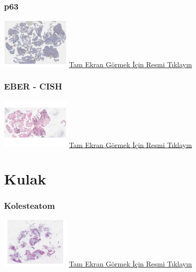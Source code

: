 \documentclass[
  letterpaper,
  DIV=11,
  numbers=noendperiod]{scrreprt}
\begin{document}
\hypertarget{p63}{%
\subsection{p63}\label{p63}}

\href{https://images.patolojiatlasi.com/nasopharynx-nonkeratinizing-scc/p63.html}{\includegraphics[width=0.25\textwidth,height=\textheight]{./screenshots/nasopharynx-nonkeratinizing-scc-p63_screenshot.png}}
\href{https://images.patolojiatlasi.com/nasopharynx-nonkeratinizing-scc/p63.html}{Tam
Ekran Görmek İçin Resmi Tıklayın}

\hypertarget{eber---cish}{%
\subsection{EBER - CISH}\label{eber---cish}}

\href{https://images.patolojiatlasi.com/nasopharynx-nonkeratinizing-scc/EBER.html}{\includegraphics[width=0.25\textwidth,height=\textheight]{./screenshots/nasopharynx-nonkeratinizing-scc-EBER_screenshot.png}}
\href{https://images.patolojiatlasi.com/nasopharynx-nonkeratinizing-scc/EBER.html}{Tam
Ekran Görmek İçin Resmi Tıklayın}

\hypertarget{sec-kulak}{%
\chapter{Kulak}\label{sec-kulak}}

\hypertarget{sec-kolesteatom}{%
\subsection{Kolesteatom}\label{sec-kolesteatom}}

\href{https://images.patolojiatlasi.com/cholesteatoma/HE.html}{\includegraphics[width=0.25\textwidth,height=\textheight]{./screenshots/cholesteatoma_screenshot.png}}
\href{https://images.patolojiatlasi.com/cholesteatoma/cholesteatoma.html}{Tam
Ekran Görmek İçin Resmi Tıklayın}
\end{document}
